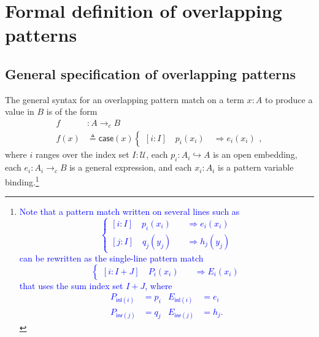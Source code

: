 \documentclass[conference]{IEEEtran}
\newtheorem{definition}{Definition}
\newcommand{\hookto}{\hookrightarrow}
\newcommand{\cto}{\to_c}
\newcommand{\Type}{\mathcal{U}}
\newcommand{\Open}[1]{\mathcal{O}({#1})}
\newcommand{\Branch}{\Rightarrow}
\newcommand{\comment}[1]{}
\newcommand{\ConsiderRemoving}[1]{\textcolor{blue}{#1}}
\begin{document}
\comment{
\begin{definition}
An \emph{inductively generated formal space} is a preorder $S$ together with a function 
\[
C : S \to \Sigma (I : \Type).\ I \to (S \to \Type),
\]
called an \emph{axiom set}.
\end{definition}

The preorder $S$ represents a base for the opens of the space. The construction in \cite{coquand2003} generates the ``free'' space $X$ whose base is $S$, with an inclusion of the base $y : S \to \Open{X}$ that satisfies, for each $s : S$, letting $(I, U) = C(s)$, for any $i : I$, 
\begin{mathpar}
\inferrule*
  {}
  {ya \le \bigvee_{b : U_i} yb}
\end{mathpar}
}

\section{Formal definition of overlapping patterns}
\label{s:patterns}

\subsection{General specification of overlapping patterns}
The general syntax for an overlapping pattern match on a term $x : A$ to produce a value in $B$ is of the form
\begin{align*}
f &: A \cto B
\\ f(x) &\triangleq \mathsf{case}(x)
\begin{cases}
[i : I] \quad p_i(x_i) \quad \Branch e_i(x_i)
\end{cases},
\end{align*}
where $i$ ranges over the index set $I : \Type$, each $p_i : A_i \hookto A$ is an open embedding, each $e_i : A_i \cto B$ is a general expression, and each $x_i : A_i$ is a pattern variable binding.\footnote{
\ConsiderRemoving{
Note that a pattern match written on several lines such as
\[
\begin{cases}
[i : I] \quad p_i(x_i) \quad &\Branch e_i(x_i)
\\ [j : I] \quad q_j(y_j) \quad &\Branch h_j(y_j)
\end{cases}
\]
can be rewritten as the single-line pattern match
\[
\begin{cases}
[i : I + J] \quad P_i(x_i) \quad &\Branch E_i(x_i)
\end{cases}
\]
that uses the sum index set $I + J$, where
\begin{align*}
P_{\mathsf{inl}(i)} &= p_i
& E_{\mathsf{inl}(i)} &= e_i
\\ P_{\mathsf{inr}(j)} &= q_j
& E_{\mathsf{inr}(j)} &= h_j.
\end{align*}
}}
\end{document}
